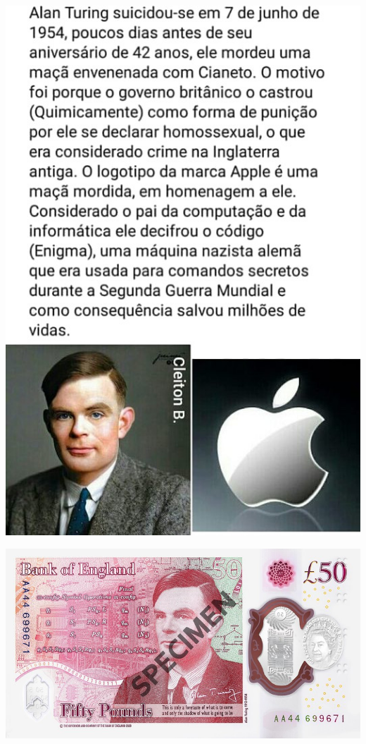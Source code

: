 \begin{multicols}{2}
\vfil\null
\columnbreak
	\begin{center}
	\includegraphics[height=.8\textheight]{./IMG/turing.jpg}
\end{center}
\vfill\null
\pagebreak

\end{multicols}

	\begin{center}
	\includegraphics[width=.9\linewidth]{./IMG/nota-turing.jpeg}
\end{center}